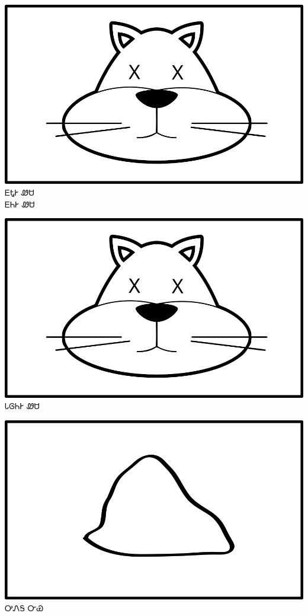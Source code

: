 \documentclass[avery5371]{flashcards}%
\begin{document}
    \begin{flashcard}{
        \includegraphics[width=0.95\columnwidth,height=.51\columnwidth,keepaspectratio]{../artwork/for-colors/wesa-dead}
    }
        \Huge ᎬᎿᎨ ᏪᏌ\\ᎬᏂᎨ ᏪᏌ
    \end{flashcard}

    \begin{flashcard}{
        \includegraphics[width=0.95\columnwidth,height=.51\columnwidth,keepaspectratio]{../artwork/for-colors/wesa-dead}
    }
        \Huge ᏓᎶᏂᎨ ᏪᏌ
    \end{flashcard}


    \begin{flashcard}{
        \includegraphics[width=0.95\columnwidth,height=.51\columnwidth,keepaspectratio]{../artwork/objects-neutral/nvya}
    }
        \Huge ᎤᏁᎦ ᏅᏯ
    \end{flashcard}
\end{document}
